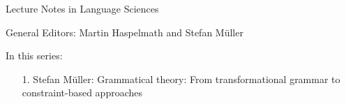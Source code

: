 
{\large Lecture Notes in Language Sciences}

\bigskip

General Editors: Martin Haspelmath and Stefan Müller

\bigskip

In this series:

\begin{enumerate}
\item[1.]\setcounter{enumi}{0} Stefan Müller: Grammatical theory: From transformational grammar to
  constraint-based approaches
\end{enumerate}
